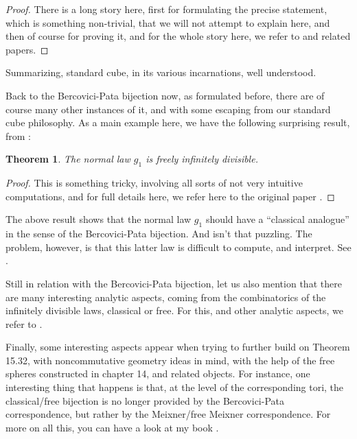 \documentclass[12pt]{amsbook}
\newtheorem{theorem}{Theorem}[chapter]
\begin{document}
\begin{proof}
There is a long story here, first for formulating the precise statement, which is something non-trivial, that we will not attempt to explain here, and then of course for proving it, and for the whole story here, we refer to \cite{bsp} and related papers.
\end{proof}

Summarizing, standard cube, in its various incarnations, well understood.

\bigskip

Back to the Bercovici-Pata bijection now, as formulated before, there are of course many other instances of it, and with some escaping from our standard cube philosophy. As a main example here, we have the following surprising result, from \cite{bbl}:


\begin{theorem}
The normal law $g_1$ is freely infinitely divisible.
\end{theorem}

\begin{proof}
This is something tricky, involving all sorts of not very intuitive computations, and for full details here, we refer here to the original paper \cite{bbl}.
\end{proof}

The above result shows that the normal law $g_1$ should have a ``classical analogue'' in the sense of the Bercovici-Pata bijection. And isn't that puzzling. The problem, however, is that this latter law is difficult to compute, and interpret. See \cite{bbl}.

\bigskip

Still in relation with the Bercovici-Pata bijection, let us also mention that there are many interesting analytic aspects, coming from the combinatorics of the infinitely divisible laws, classical or free. For this, and other analytic aspects, we refer to \cite{bpa}.

\bigskip

Finally, some interesting aspects appear when trying to further build on Theorem 15.32, with noncommutative geometry ideas in mind, with the help of the free spheres constructed in chapter 14, and related objects.  For instance, one interesting thing that happens is that, at the level of the corresponding tori, the classical/free bijection is no longer provided by the Bercovici-Pata correspondence, but rather by the Meixner/free Meixner correspondence. For more on all this, you can have a look at my book \cite{ba3}.
\end{document}
